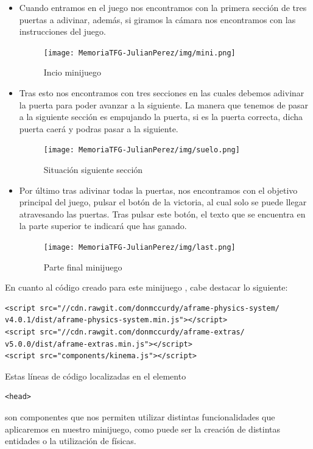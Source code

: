 \documentclass[a4paper, 12pt]{book}
\begin{document}
\begin{itemize}
    \item Cuando entramos en el juego nos encontramos con la primera sección de tres puertas a adivinar, además, si giramos la cámara nos encontramos con las instrucciones del juego.
    \begin{figure}[H]
  \centering
  \texttt{[image: MemoriaTFG-JulianPerez/img/mini.png]}
  \caption{Incio minijuego}\label{scrum}
\end{figure}
    \item Tras esto nos encontramos con tres secciones en las cuales debemos adivinar la puerta para poder avanzar a la siguiente. La manera que tenemos de pasar a la siguiente sección es empujando la puerta, si es la puerta correcta, dicha puerta caerá y podras pasar a la siguiente.
     \begin{figure}[H]
  \centering
  \texttt{[image: MemoriaTFG-JulianPerez/img/suelo.png]}
  \caption{Situación siguiente sección}\label{scrum}
\end{figure}
    \item Por último tras adivinar todas la puertas, nos encontramos con el objetivo principal del juego, pulsar el botón de la victoria, al cual solo se puede llegar atravesando las puertas. Tras pulsar este botón, el texto que se encuentra en la parte superior te indicará que has ganado.
         \begin{figure}[H]
  \centering
  \texttt{[image: MemoriaTFG-JulianPerez/img/last.png]}
  \caption{Parte final minijuego}\label{scrum}
\end{figure}

\end{itemize}

En cuanto al código creado para este minijuego , cabe destacar lo siguiente:
\begin{verbatim}
<script src="//cdn.rawgit.com/donmccurdy/aframe-physics-system/
v4.0.1/dist/aframe-physics-system.min.js"></script>
<script src="//cdn.rawgit.com/donmccurdy/aframe-extras/
v5.0.0/dist/aframe-extras.min.js"></script>
<script src="components/kinema.js"></script>
\end{verbatim}  
Estas líneas de código localizadas en el elemento \begin{verbatim}
<head>
\end{verbatim} son componentes que nos permiten utilizar distintas funcionalidades que aplicaremos en nuestro minijuego, como puede ser la creación de distintas entidades o la utilización de físicas.
\end{document}
